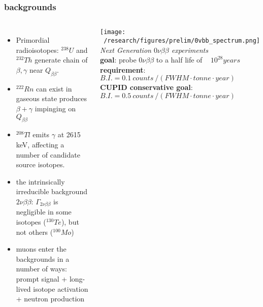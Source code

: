 \documentclass{beamer}
\begin{document}
	\begin{frame}
		\frametitle{backgrounds}
		\begin{columns}[c] %
			
			\begin{itemize}
			\item Primordial radioisotopes: $^{238}U$ and $^{232}Th$ generate chain of $\beta , \gamma$ near $Q_{\beta\beta}$.
			\item $^{222}Rn$ can exist in gaseous state produces $\beta + \gamma$ impinging on $Q_{\beta\beta}$
			\item $^{208}Tl$ emits $\gamma$ at 2615 keV, affecting a number of candidate source isotopes.
			\item the intrinsically irreducible background $2\nu\beta\beta$: $\Gamma_{2\nu\beta\beta}$ is negligible in some isotopes ($^{130}Te$), but not others ($^{100}Mo$)
			\item muons enter the backgrounds in a number of ways: prompt signal + long-lived isotope activation + neutron production
			\end{itemize}			 
			
		
			\texttt{[image: ~/research/figures/prelim/0vbb\_spectrum.png]}
			{\footnotesize \textit{Next Generation $0\nu\beta\beta$ experiments} \\
			\textbf{goal}: probe $0\nu\beta\beta$ to a half life of ~ $10^{28} years$ \\
			\textbf{requirement}: $B.I. = 0.1 \ counts\ / \left( FWHM\cdot tonne \cdot year \right)$ \\
			\textbf{CUPID conservative goal}: $B.I. = 0.5 \ counts\ / \left( FWHM\cdot tonne \cdot year \right)$}
			
		\end{columns}
	\end{frame}
	
\end{document}

